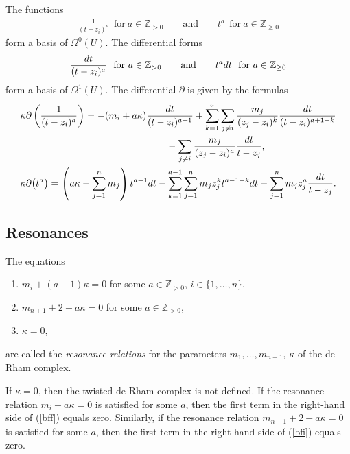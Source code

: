 \documentclass[11pt]{article}
\numberwithin{equation}{section}
\begin{document}
The functions
\begin{gather*}
\frac1{(t-z_i)^{a}}\ \ \text{for}\ a\in{\mathbb Z}_{>0} \qquad\text{and}\qquad t^a\ \ \text{for}\ a\in{\mathbb Z}_{\geq 0}
\end{gather*}
form a basis of $\Omega^0(U)$. The differential forms
\begin{gather*}
\frac{{\rm d}t}{(t-z_i)^a}\ \ \text{for}\ a\in{\mathbb Z}_{>0} \qquad \text{and}\qquad t^a{\rm d}t\ \ \text{for}\ a\in{\mathbb Z}_{\geq 0}
\end{gather*}
form a basis of $\Omega^1(U)$. The differential $\partial$ is given by the formulas
\begin{gather}
\kappa \partial\left(\frac1{(t-z_i)^{a}}\right) = -(m_i+a\kappa)\frac{{\rm d} t}{(t-z_i)^{a+1}}
+ \sum_{k=1}^a\sum_{j\neq i} \frac{m_j}{(z_j-z_i)^k} \frac{{\rm d}t}{(t-z_i)^{a+1-k}} \nonumber\\
\hphantom{\kappa \partial\left(\frac1{(t-z_i)^{a}}\right) =}{} -\sum_{j\neq i}\frac{ m_j}{(z_j-z_i)^a} \frac{{\rm d}t}{t-z_j}, \label{bff} \\
\kappa \partial\big(t^a\big) = \left(a\kappa -\sum_{j=1}^n m_j\right)t^{a-1}dt -\sum_{k=1}^{a-1} \sum_{j=1}^n m_jz_j^k t^{a-1-k}{\rm d}t-\sum_{j=1}^n m_jz_j^a \frac{{\rm d}t}{t-z_j}.\label{bfi}
\end{gather}


\subsection{Resonances}\label{reson}
The equations
\begin{enumerate}\itemsep=0pt
\item[(i)] $m_i+(a-1)\kappa=0$ for some $a\in {\mathbb Z}_{>0}$, $i\in\{1,\dots,n\}$,
\item[(ii)] $m_{n+1}+2-a\kappa=0$ for some $a\in {\mathbb Z}_{>0}$,
\item[(iii)] $\kappa=0$,
\end{enumerate}
are called the {\it resonance relations} for the parameters $m_1,\dots,m_{n+1}$, $\kappa$ of the de Rham complex.

If $\kappa=0$, then the twisted de Rham complex is not defined. If the resonance relation \mbox{$m_i+a\kappa=0$} is satisfied for some $a$, then the first term in the right-hand side of (\ref{bff}) equals zero. Similarly, if the resonance relation $m_{n+1}+2-a\kappa=0$ is satisfied for some $a$, then the first term in the right-hand side of (\ref{bfi}) equals zero.
\end{document}

